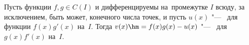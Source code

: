 
  Пусть функции $f,g\in C(I)$ и дифференцируемы на~промежутке $I$ всюду, за исключением, быть может, конечного числа точек, и пусть $u(x)$ "--- \op\ для
  функции $f(x)g'(x)$ на~$I$.
  Тогда $v(x)\hm=f(x)g(x)-u(x)$ "--- \op\ для $g(x)f'(x)$ на~$I$.
